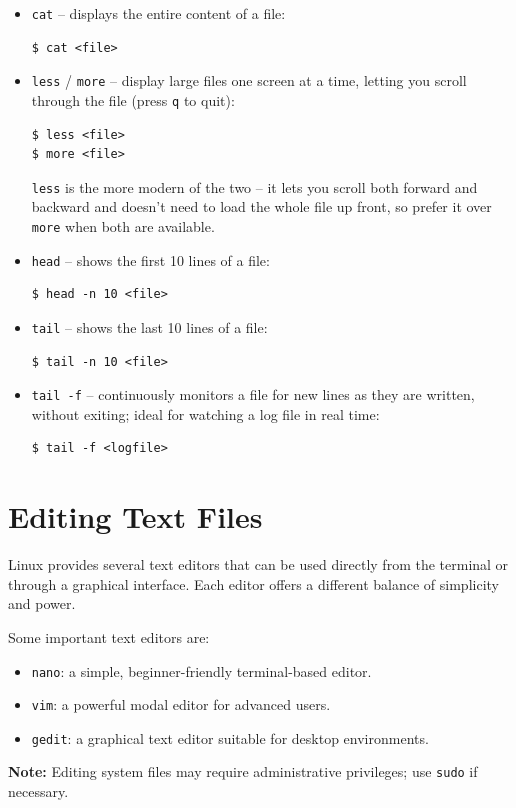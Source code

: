 \begin{itemize}
    \item \texttt{cat} -- displays the entire content of a file:
\begin{lstlisting}[language=Terminal]
$ cat <file>
\end{lstlisting}

    \item \texttt{less} / \texttt{more} -- display large files one screen at a time, letting you scroll through the file (press \texttt{q} to quit):
\begin{lstlisting}[language=Terminal]
$ less <file>
$ more <file>
\end{lstlisting}
    \texttt{less} is the more modern of the two -- it lets you scroll both forward and backward and doesn't need to load the whole file up front, so prefer it over \texttt{more} when both are available.

    \item \texttt{head} -- shows the first 10 lines of a file:
\begin{lstlisting}[language=Terminal]
$ head -n 10 <file>
\end{lstlisting}

    \item \texttt{tail} -- shows the last 10 lines of a file:
\begin{lstlisting}[language=Terminal]
$ tail -n 10 <file>
\end{lstlisting}

    \item \texttt{tail -f} -- continuously monitors a file for new lines as they are written, without exiting; ideal for watching a log file in real time:
\begin{lstlisting}[language=Terminal]
$ tail -f <logfile>
\end{lstlisting}
\end{itemize}

\section{Editing Text Files}
Linux provides several text editors that can be used directly from the terminal or through a graphical interface. Each editor offers a different balance of simplicity and power.

Some important text editors are:
\begin{itemize}
    \item \texttt{nano}: a simple, beginner-friendly terminal-based editor.
    \item \texttt{vim}: a powerful modal editor for advanced users.
    \item \texttt{gedit}: a graphical text editor suitable for desktop environments.
\end{itemize}
\textbf{Note:} Editing system files may require administrative privileges; use \texttt{sudo} if necessary.

